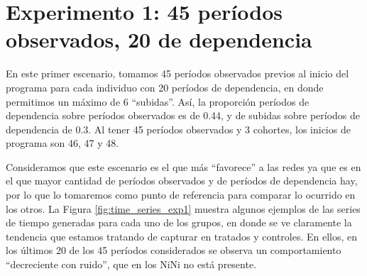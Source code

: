 \documentclass[../../main.tex]{subfiles}
\begin{document}
\section{Experimento 1: 45 períodos observados, 20 de dependencia}
En este primer escenario, tomamos 45 períodos observados previos al inicio del programa
para cada individuo con 20 períodos de dependencia, en donde permitimos un máximo de 6
``subidas''. Así, la proporción períodos de dependencia sobre períodos observados es de
0.44, y de subidas sobre períodos de dependencia de 0.3. Al tener 45 períodos observados y
3 cohortes, los inicios de programa son 46, 47 y 48.


Consideramos que este escenario es el que más ``favorece'' a las redes ya que es en el que
mayor cantidad de períodos observados y de períodos de dependencia hay, por lo que lo
tomaremos como punto de referencia para comparar lo ocurrido en los otros. La Figura
\ref{fig:time_series_exp1} muestra algunos ejemplos de las series de tiempo generadas para
cada uno de los grupos, en donde se ve claramente la tendencia que estamos tratando de
capturar en tratados y controles. En ellos, en los últimos 20 de los 45 períodos
considerados se observa un comportamiento ``decreciente con ruido'', que en los NiNi no
está presente.
\end{document}
